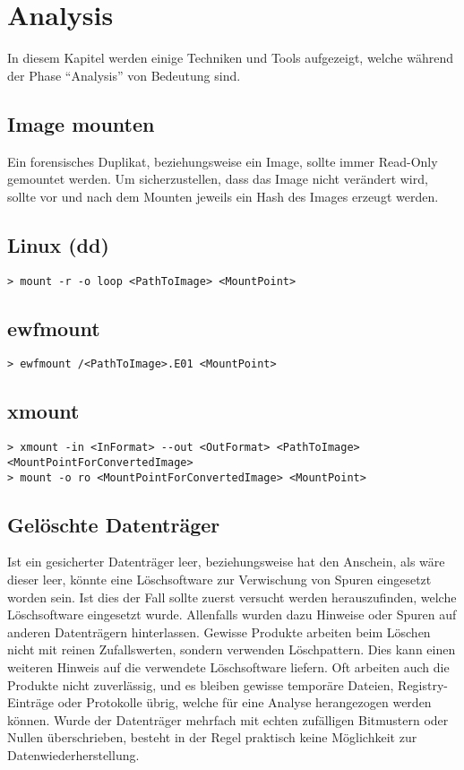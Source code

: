 \section{Analysis}
In diesem Kapitel werden einige Techniken und Tools aufgezeigt, welche während der Phase "`Analysis"' von Bedeutung sind. 



\subsection{Image mounten}
Ein forensisches Duplikat, beziehungsweise ein Image, sollte immer Read-Only gemountet werden. Um sicherzustellen, dass das Image nicht verändert wird, sollte vor und nach dem Mounten jeweils ein Hash des Images erzeugt werden.

\subsection{Linux (dd)}
\begin{lstlisting}
> mount -r -o loop <PathToImage> <MountPoint>
\end{lstlisting}

\subsection{ewfmount}
\begin{lstlisting}
> ewfmount /<PathToImage>.E01 <MountPoint>
\end{lstlisting}

\subsection{xmount}
\begin{lstlisting}
> xmount -in <InFormat> --out <OutFormat> <PathToImage> <MountPointForConvertedImage>
> mount -o ro <MountPointForConvertedImage> <MountPoint>
\end{lstlisting}

\subsection{Gelöschte Datenträger}
Ist ein gesicherter Datenträger leer, beziehungsweise hat den Anschein, als wäre dieser leer, könnte eine Löschsoftware zur Verwischung von Spuren eingesetzt worden sein. Ist dies der Fall sollte zuerst versucht werden herauszufinden, welche Löschsoftware eingesetzt wurde. Allenfalls wurden dazu Hinweise oder Spuren auf anderen Datenträgern hinterlassen. Gewisse Produkte arbeiten beim Löschen nicht mit reinen Zufallswerten, sondern verwenden Löschpattern. Dies kann einen weiteren Hinweis auf die verwendete Löschsoftware liefern. Oft arbeiten auch die Produkte nicht zuverlässig, und es bleiben gewisse temporäre Dateien, Registry-Einträge oder Protokolle übrig, welche für eine Analyse herangezogen werden können. Wurde der Datenträger mehrfach mit echten zufälligen Bitmustern oder Nullen überschrieben, besteht in der Regel praktisch keine Möglichkeit zur Datenwiederherstellung.


